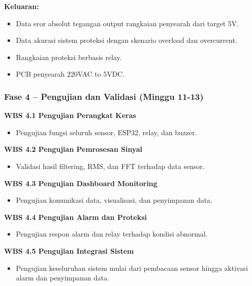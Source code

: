 \documentclass{elsinta}
\begin{document}
\textbf{Keluaran:}
\begin{itemize}
    \item Data eror absolut tegangan output rangkaian penyearah dari target 5V.
    \item Data akurasi sistem proteksi dengan skenario overload dan overcurrent.
    \item Rangkaian proteksi berbasis relay.
    \item PCB penyearah 220VAC to 5VDC.
\end{itemize}
\subsubsection*{Fase 4 -- Pengujian dan Validasi (Minggu 11-13)}

\textbf{WBS 4.1 Pengujian Perangkat Keras}

\begin{itemize}
    \item Pengujian fungsi seluruh sensor, ESP32, relay, dan buzzer.
\end{itemize}

\textbf{WBS 4.2 Pengujian Pemrosesan Sinyal}

\begin{itemize}
    \item Validasi hasil filtering, RMS, dan FFT terhadap data sensor.
\end{itemize}

\textbf{WBS 4.3 Pengujian Dashboard Monitoring}

\begin{itemize}
    \item Pengujian komunikasi data, visualisasi, dan penyimpanan data.
\end{itemize}

\textbf{WBS 4.4 Pengujian Alarm dan Proteksi}

\begin{itemize}
    \item Pengujian respon alarm dan relay terhadap kondisi abnormal.
\end{itemize}

\textbf{WBS 4.5 Pengujian Integrasi Sistem}

\begin{itemize}
    \item Pengujian keseluruhan sistem mulai dari pembacaan sensor hingga aktivasi alarm dan penyimpanan data.
\end{itemize}
\end{document}

